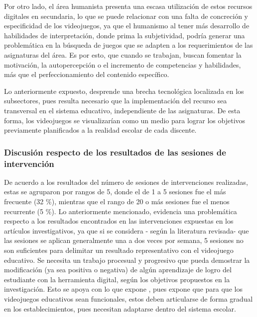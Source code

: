 \documentclass[spanish]{textolivre}
\begin{document}
Por otro lado, el área humanista presenta una escasa utilización de estos recursos digitales en secundaria, lo que se puede relacionar con una falta de concreción y especificidad de los videojuegos, ya que el humanismo al tener más desarrollo de habilidades de interpretación, donde prima la subjetividad, podría generar una problemática en la búsqueda de juegos que se adapten a los requerimientos de las asignaturas del área. Es por esto, que cuando se trabajan, buscan fomentar la motivación, la autopercepción o el incremento de competencias y habilidades, más que el perfeccionamiento del contenido específico. 

Lo anteriormente expuesto, desprende una brecha tecnológica localizada en los subsectores, pues resulta necesario que la implementación del recurso sea transversal en el sistema educativo, independiente de las asignaturas. De esta forma, los videojuegos se visualizarían como un medio para lograr los objetivos previamente planificados a la realidad escolar de cada discente. 

\subsubsection{Discusión respecto de los resultados de las sesiones de intervención}\label{sec-equacao}
De acuerdo a los resultados del número de sesiones de intervenciones realizadas, estas se agruparon por rangos de 5, donde el de 1 a 5 sesiones fue el más frecuente (32 \%), mientras que el rango de 20 o más sesiones fue el menos recurrente (5 \%). Lo anteriormente mencionado, evidencia una problemática respecto a los resultados encontrados en las intervenciones expuestas en los artículos investigativos, ya que si se considera - según la literatura revisada- que las sesiones se aplican generalmente una a dos veces por semana, 5 sesiones no son suficientes para delimitar un resultado representativo con el videojuego educativo. Se necesita un trabajo procesual y progresivo que pueda demostrar la modificación (ya sea positiva o negativa) de algún aprendizaje de logro del estudiante con la herramienta digital, según los objetivos propuestos en la investigación. Esto se apoya con lo que expone \textcite{leon-atiencia_videojuegos_nodate}, pues expone que para que los videojuegos educativos sean funcionales, estos deben articularse de forma gradual en los establecimientos, pues necesitan adaptarse dentro del sistema escolar. 
\end{document}
